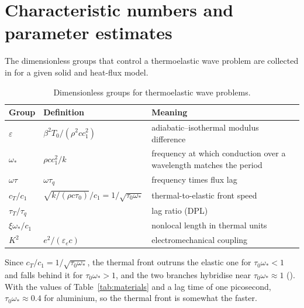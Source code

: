 \section{Characteristic numbers and parameter estimates}\label{app:numbers}
The dimensionless groups that control a thermoelastic wave problem are collected in  for a given solid and heat-flux model.
\begin{table}[ht]\centering\small
\caption{Dimensionless groups for thermoelastic wave problems.}\label{tab:groups}
\begin{tabular}{@{}llp{6.2cm}@{}}\toprule
Group & Definition & Meaning\\\midrule
$\varepsilon$ & $\beta^2T_0/(\rho^2cc_1^2)$ & adiabatic--isothermal modulus difference\\
$\omega_*$ & $\rho cc_1^2/k$ & frequency at which conduction over a wavelength matches the period\\
$\omega\tau$ & $\omega\tau_q$ & frequency times flux lag\\
$c_T/c_1$ & $\sqrt{k/(\rho c\tau_0)}/c_1=1/\sqrt{\tau_0\omega_*}$ & thermal-to-elastic front speed\\
$\tau_T/\tau_q$ & & lag ratio (DPL)\\
$\xi\omega_*/c_1$ & & nonlocal length in thermal units\\
$K^2$ & $e^2/(\varepsilon_ec)$ & electromechanical coupling\\
\bottomrule\end{tabular}
\end{table}
Since $c_T/c_1=1/\sqrt{\tau_0\omega_*}$, the thermal front outruns the elastic one for $\tau_0\omega_*<1$ and falls behind it for $\tau_0\omega_*>1$, and the two branches hybridise near $\tau_0\omega_*\approx1$ (). With the values of Table~\ref{tab:materials} and a lag time of one picosecond, $\tau_0\omega_*\approx0.4$ for aluminium, so the thermal front is somewhat the faster.
